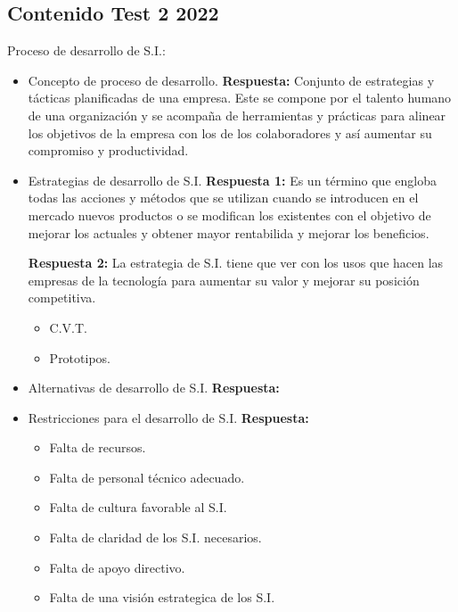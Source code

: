 \documentclass{templateNote}
\begin{document}
\subsection{Contenido Test 2 2022}
Proceso de desarrollo de S.I.:
\begin{itemize}
    \item Concepto de proceso de desarrollo.\newline
    \textbf{Respuesta:} Conjunto de estrategias y t\'acticas planificadas de una empresa. Este se compone por el talento humano de una organizaci\'on y se acompa\~na de herramientas y pr\'acticas para alinear los objetivos de la empresa con los de los colaboradores y as\'i aumentar su compromiso y productividad.
    
    \item Estrategias de desarrollo de S.I.\newline
    \textbf{Respuesta 1:} Es un t\'ermino que engloba todas las acciones y m\'etodos que se utilizan cuando se introducen en el mercado nuevos productos o se modifican los existentes con el objetivo de mejorar los actuales y obtener mayor rentabilida y mejorar los beneficios.
    
    \textbf{Respuesta 2:} La estrategia de S.I. tiene que ver con los usos que hacen las empresas de la tecnolog\'ia para aumentar su valor y mejorar su posici\'on competitiva.
    \begin{itemize}
        \item C.V.T.
        \item Prototipos.
    \end{itemize}
    
    \item Alternativas de desarrollo de S.I.\newline
    \textbf{Respuesta: }
    
    \item Restricciones para el desarrollo de S.I.\newline
    \textbf{Respuesta:}
    \begin{itemize}
        \item Falta de recursos.
        \item Falta de personal t\'ecnico adecuado.
        \item Falta de cultura favorable al S.I.
        \item Falta de claridad de los S.I. necesarios.
        \item Falta de apoyo directivo.
        \item Falta de una visi\'on estrategica de los S.I.
    \end{itemize}
\end{itemize}
\end{document}
